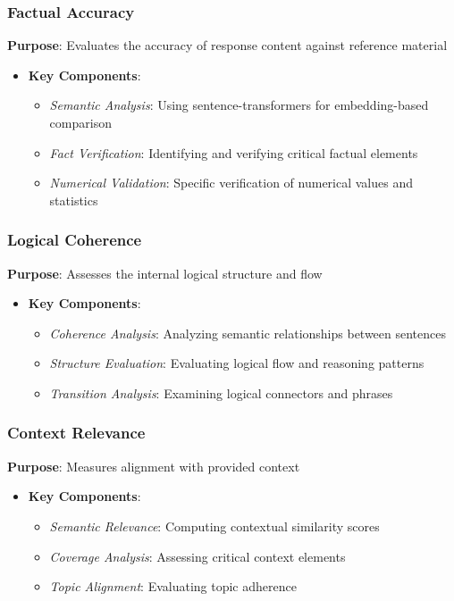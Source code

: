 \vspace{0.5em}
\subsubsection{Factual Accuracy}
\textbf{Purpose}: Evaluates the accuracy of response content against reference material
\begin{itemize}
    \item \textbf{Key Components}:
    \begin{itemize}
        \item \textit{Semantic Analysis}: Using sentence-transformers for embedding-based comparison
        \item \textit{Fact Verification}: Identifying and verifying critical factual elements
        \item \textit{Numerical Validation}: Specific verification of numerical values and statistics
    \end{itemize}
\end{itemize}

\vspace{0.5em}
\subsubsection{Logical Coherence}
\textbf{Purpose}: Assesses the internal logical structure and flow
\begin{itemize}
    \item \textbf{Key Components}:
    \begin{itemize}
        \item \textit{Coherence Analysis}: Analyzing semantic relationships between sentences
        \item \textit{Structure Evaluation}: Evaluating logical flow and reasoning patterns
        \item \textit{Transition Analysis}: Examining logical connectors and phrases
    \end{itemize}
\end{itemize}

\vspace{0.5em}
\subsubsection{Context Relevance}
\textbf{Purpose}: Measures alignment with provided context
\begin{itemize}
    \item \textbf{Key Components}:
    \begin{itemize}
        \item \textit{Semantic Relevance}: Computing contextual similarity scores
        \item \textit{Coverage Analysis}: Assessing critical context elements
        \item \textit{Topic Alignment}: Evaluating topic adherence
    \end{itemize}
\end{itemize}

